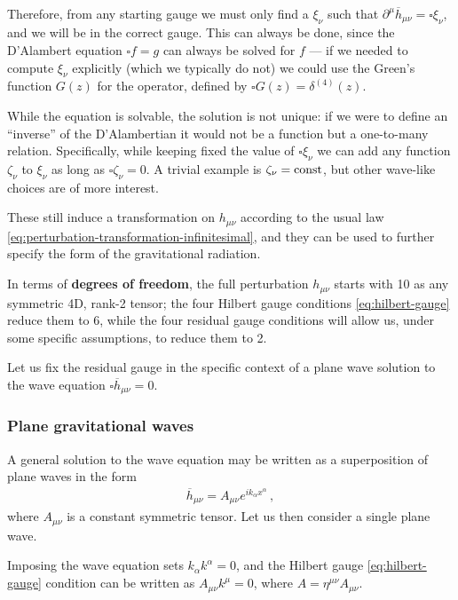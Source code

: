 \documentclass[main.tex]{subfiles}
\begin{document}
Therefore, from any starting gauge we must only find a \(\xi_{\nu }\) such that \(\partial^{\mu } \overline{h}_{\mu \nu } = \square \xi_{\nu }\), and we will be in the correct gauge. 
This can always be done, since the D'Alambert equation \(\square f = g\) can always be solved for \(f\) --- if we needed to compute \(\xi_{\nu }\) explicitly (which we typically do not) we could use the Green's function \(G(z)\) for the operator, defined by \(\square G(z) = \delta^{(4)} (z)\). 

While the equation is solvable, the solution is not unique: if we were to define an ``inverse'' of the D'Alambertian it would not be a function but a one-to-many relation. 
Specifically, while keeping fixed the value of \(\square \xi_{\nu }\) we can add any function \(\zeta_\nu \) to \(\xi _\nu  \) as long as \(\square \zeta _\nu = 0 \). 
A trivial example is \(\zeta _\nu = \text{const}\), but other wave-like choices are of more interest. 

These still induce a transformation on \(h_{\mu \nu }\) according to the usual law \eqref{eq:perturbation-transformation-infinitesimal}, and they can be used to further specify the form of the gravitational radiation. 

In terms of \textbf{degrees of freedom}, the full perturbation \(h_{\mu \nu }\) starts with 10 as any symmetric 4D, rank-2 tensor; the four Hilbert gauge conditions \eqref{eq:hilbert-gauge} reduce them to 6, while the four residual gauge conditions will allow us, under some specific assumptions, to reduce them to 2. 

Let us fix the residual gauge in the specific context of a plane wave solution to the wave equation \(\square \overline{h}_{\mu \nu } = 0\).

\subsubsection{Plane gravitational waves} \label{sec:plane-gws}

A general solution to the wave equation may be written as a superposition of plane waves in the form
%
\begin{align}
\overline{h}_{\mu \nu } = A_{\mu \nu } e^{i k_\alpha x^{\alpha }}
\,,
\end{align}
%
where \(A_{\mu \nu }\) is a constant symmetric tensor.
Let us then consider a single plane wave.

Imposing the wave equation sets \(k_{\alpha } k^{\alpha } = 0\), and the Hilbert gauge \eqref{eq:hilbert-gauge} condition can be written as \(A_{\mu \nu } k^{\mu } = 0\), where \(A = \eta^{\mu \nu } A_{\mu \nu }\). 
\end{document}
